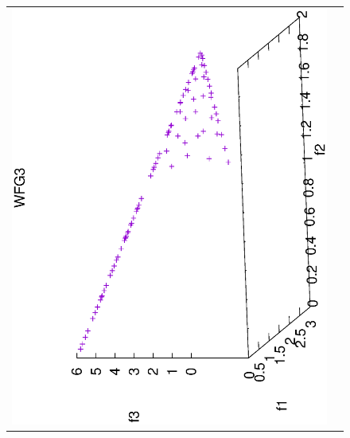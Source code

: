 \begin{figure}[H]
\begin{tabular}{cc}
  \includegraphics[scale=0.3, angle=-90,origin=c]{Figures_Chapter7/Results_Chapter4/Summary_Representative/VSD-MOEA-D/WFG3.eps} \\

\end{tabular}
\end{figure}
